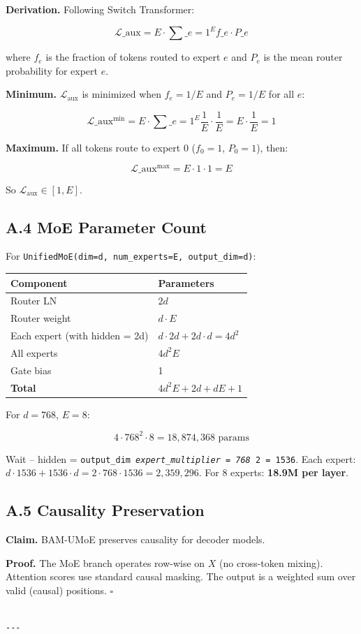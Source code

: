 \textbf{Derivation.} Following Switch Transformer:

\[
\mathcal{L}\_\text{aux} = E \cdot \sum\_{e=1}^{E} f\_e \cdot P\_e
\]

where $f_e$ is the fraction of tokens routed to expert $e$ and $P_e$ is the 
mean router probability for expert $e$.

\textbf{Minimum.} $\mathcal{L}_\text{aux}$ is minimized when $f_e = 1/E$ and 
$P_e = 1/E$ for all $e$:

\[
\mathcal{L}\_\text{aux}^\text{min} = E \cdot \sum\_{e=1}^{E} \frac{1}{E} \cdot \frac{1}{E} = E \cdot \frac{1}{E} = 1
\]

\textbf{Maximum.} If all tokens route to expert 0 ($f_0 = 1$, $P_0 = 1$), then:

\[
\mathcal{L}\_\text{aux}^\text{max} = E \cdot 1 \cdot 1 = E
\]

So $\mathcal{L}_\text{aux} \in [1, E]$.

\subsection{A.4 MoE Parameter Count}

For \texttt{UnifiedMoE(dim=d, num\_experts=E, output\_dim=d)}:

\begin{table}[H]
\centering
\small
\begin{tabular}{ll}
\toprule
\textbf{Component} & \textbf{Parameters} \\
\midrule
Router LN & $2d$ \\
Router weight & $d \cdot E$ \\
Each expert (with hidden = 2d) & $d \cdot 2d + 2d \cdot d = 4d^2$ \\
All experts & $4d^2 E$ \\
Gate bias & 1 \\
\textbf{Total} & $4d^2 E + 2d + dE + 1$ \\
\bottomrule
\end{tabular}
\end{table}

For $d = 768$, $E = 8$: 

\[
4 \cdot 768^2 \cdot 8 = 18{,}874{,}368 \text{ params}
\]

Wait -- hidden = \texttt{output\_dim \textit{ expert\_multiplier = 768 } 2 = 1536}. Each 
expert: $d \cdot 1536 + 1536 \cdot d = 2 \cdot 768 \cdot 1536 = 2{,}359{,}296$. 
For 8 experts: \textbf{18.9M per layer}.

\subsection{A.5 Causality Preservation}

\textbf{Claim.} BAM-UMoE preserves causality for decoder models.

\textbf{Proof.} The MoE branch operates row-wise on $X$ (no cross-token mixing). 
Attention scores use standard causal masking. The output is a weighted sum 
over valid (causal) positions. $\square$
\begin{lstlisting}

---
\end{lstlisting}